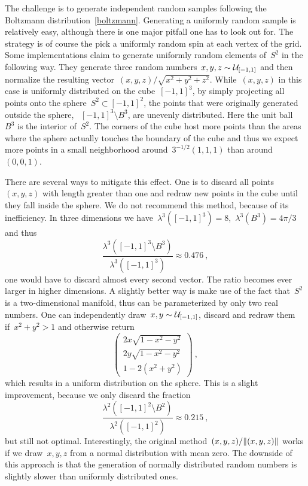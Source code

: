 The challenge is to generate independent random samples following the Boltzmann
distribution~\eqref{boltzmann}. Generating a uniformly random sample is
relatively easy, although there is one major pitfall one has to look out for.
The strategy is of course the pick a uniformly random spin at each vertex of the
grid. Some implementations claim to generate uniformly random elements of~$S^2$
in the following way. They generate three random numbers~$x,y,z \sim
\mathcal{U}_{[-1,1]}$ and then normalize the resulting vector~$(x,y,z) / \sqrt{x^2 + y^2
+ z^2}$. While~$(x,y,z)$ in this case is uniformly distributed on the
cube~$[-1,1]^3$, by simply projecting all points onto the sphere~$S^2 \subset
[-1,1]^2$, the points that were originally generated outside the sphere,
\ie{}~$[-1,1]^3 \setminus B^3$, are unevenly distributed. Here the unit
ball~$B^3$ is the interior of~$S^2$. The corners of the cube host more points
than the areas where the sphere actually touches the boundary of the cube and
thus we expect more points in a small neighborhood around~$3^{-1/2} (1,1,1)$
than around~$(0,0,1)$.

There are several ways to mitigate this effect. One is to discard all
points~$(x,y,z)$ with length greater than one and redraw new points in the cube
until they fall inside the sphere. We do not recommend this method, because of
its inefficiency. In three dimensions we have~$\lambda^3([-1,1]^3) =
8$,~$\lambda^3(B^3) = 4 \pi / 3$ and thus
%
\begin{equation}
  \frac{\lambda^3([-1,1]^3 \setminus B^3)}{\lambda^3([-1,1]^3)} \approx 0.476\:,
\end{equation}
%
\ie{} one would have to discard almost every second vector. The ratio becomes
ever larger in higher dimensions. A slightly better way is make use of the fact
that~$S^2$ is a two-dimensional manifold, thus can be parameterized by only two
real numbers. One can independently draw~$x,y \sim \mathcal{U}_{[-1,1]}$, discard and
redraw them if~$x^2 + y^2 > 1$ and otherwise return
%
\begin{equation}
  \begin{pmatrix}
    2 x \sqrt{1 - x^2 - y^2} \\
    2 y \sqrt{1 - x^2 - y^2} \\
    1 - 2 (x^2 + y^2)
  \end{pmatrix} \:,
\end{equation}
%
which results in a uniform distribution on the sphere. This is a slight
improvement, because we only discard the fraction
%
\begin{equation}
  \frac{\lambda^2([-1,1]^2 \setminus B^2)}{\lambda^2([-1,1]^2)} \approx 0.215\:,
\end{equation}
%
but still not optimal. Interestingly, the original
method~$(x,y,z)/\norm{(x,y,z)}$ works if we draw~$x,y,z$ from a normal
distribution with mean zero. The downside of this approach is that the
generation of normally distributed random numbers is slightly slower than
uniformly distributed ones.

